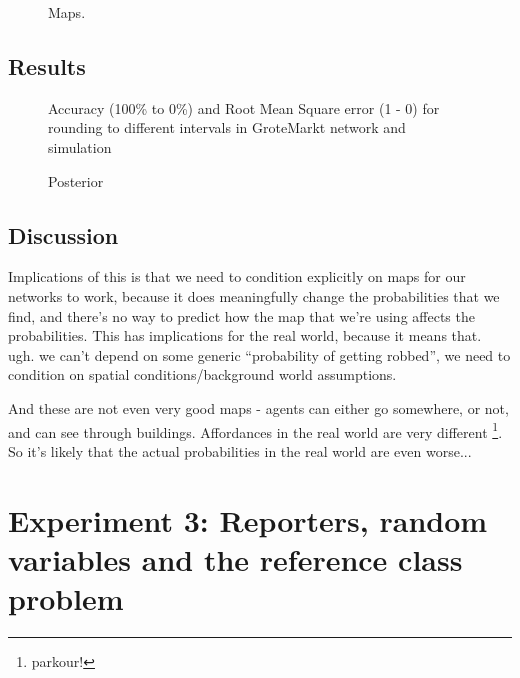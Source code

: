 \begin{figure}[htbp]
\begin{center}
\caption{Maps.}
\label{maps}
\end{center}
\end{figure}


\subsection{Results}

\begin{figure}[htbp]
\begin{center}
\caption{Accuracy (100\% to 0\%) and Root Mean Square error (1 - 0) for rounding to different intervals in GroteMarkt network and simulation}
\label{groteMarktMapsperfo}
\end{center}
\end{figure}

\begin{figure}[htbp]
\begin{center}
\caption{Posterior}
\label{groteMarktMapsp}
\end{center}
\end{figure}


\subsection{Discussion}
Implications of this is that we need to condition explicitly on maps for our networks to work, because it does meaningfully change the probabilities that we find, and there's no way to predict how the map that we're using affects the probabilities. This has implications for the real world, because it means that. ugh. we can't depend on some generic ``probability of getting robbed'', we need to condition on spatial conditions/background world assumptions.

And these are not even very good maps - agents can either go somewhere, or not, and can see through buildings. Affordances in the real world are very different \footnote{parkour!}. So it's likely that the actual probabilities in the real world are even worse...

\section{Experiment 3: Reporters, random variables and the reference class problem}

